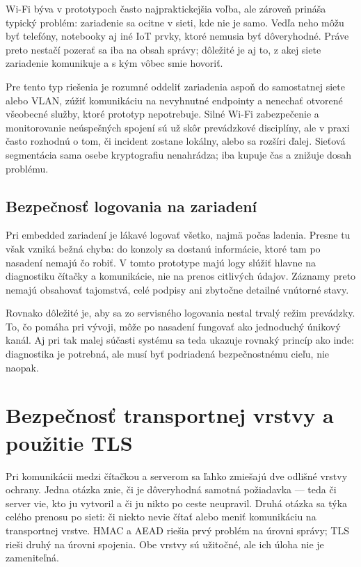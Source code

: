 \documentclass[journal,a4paper,onecolumn]{IEEEtran}
\begin{document}
Wi-Fi býva v prototypoch často najpraktickejšia voľba, ale zároveň prináša typický problém: zariadenie sa ocitne v sieti, kde nie je samo. Vedľa neho môžu byť telefóny, notebooky aj iné IoT prvky, ktoré nemusia byť dôveryhodné. Práve preto nestačí pozerať sa iba na obsah správy; dôležité je aj to, z akej siete zariadenie komunikuje a s kým vôbec smie hovoriť.

Pre tento typ riešenia je rozumné oddeliť zariadenia aspoň do samostatnej siete alebo VLAN, zúžiť komunikáciu na nevyhnutné endpointy a nenechať otvorené všeobecné služby, ktoré prototyp nepotrebuje. Silné Wi-Fi zabezpečenie a monitorovanie neúspešných spojení sú už skôr prevádzkové disciplíny, ale v praxi často rozhodnú o tom, či incident zostane lokálny, alebo sa rozšíri ďalej. Sieťová segmentácia sama osebe kryptografiu nenahrádza; iba kupuje čas a znižuje dosah problému.

\subsection{Bezpečnosť logovania na zariadení}

Pri embedded zariadení je lákavé logovať všetko, najmä počas ladenia. Presne tu však vzniká bežná chyba: do konzoly sa dostanú informácie, ktoré tam po nasadení nemajú čo robiť. V tomto prototype majú logy slúžiť hlavne na diagnostiku čítačky a komunikácie, nie na prenos citlivých údajov. Záznamy preto nemajú obsahovať tajomstvá, celé podpisy ani zbytočne detailné vnútorné stavy.

Rovnako dôležité je, aby sa zo servisného logovania nestal trvalý režim prevádzky. To, čo pomáha pri vývoji, môže po nasadení fungovať ako jednoduchý únikový kanál. Aj pri tak malej súčasti systému sa teda ukazuje rovnaký princíp ako inde: diagnostika je potrebná, ale musí byť podriadená bezpečnostnému cieľu, nie naopak.


\section{Bezpečnosť transportnej vrstvy a použitie TLS}

Pri komunikácii medzi čítačkou a serverom sa ľahko zmiešajú dve odlišné vrstvy ochrany. Jedna otázka znie, či je dôveryhodná samotná požiadavka --- teda či server vie, kto ju vytvoril a či ju nikto po ceste neupravil. Druhá otázka sa týka celého prenosu po sieti: či niekto nevie čítať alebo meniť komunikáciu na transportnej vrstve. HMAC a AEAD riešia prvý problém na úrovni správy; TLS rieši druhý na úrovni spojenia. Obe vrstvy sú užitočné, ale ich úloha nie je zameniteľná.\cite{RFC8446,RFC9325}
\end{document}
